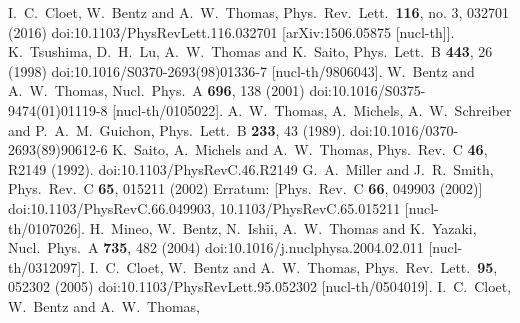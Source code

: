 \documentclass{ws-ijmpe}
\begin{document}
\begin{thebibliography}{0}
  I.~C.~Cloet, W.~Bentz and A.~W.~Thomas,
  Phys.\ Rev.\ Lett.\  {\bf 116}, no. 3, 032701 (2016)
  doi:10.1103/PhysRevLett.116.032701
  [arXiv:1506.05875 [nucl-th]].
%
  K.~Tsushima, D.~H.~Lu, A.~W.~Thomas and K.~Saito,
  Phys.\ Lett.\ B {\bf 443}, 26 (1998)
  doi:10.1016/S0370-2693(98)01336-7
  [nucl-th/9806043].
%
  W.~Bentz and A.~W.~Thomas,
  Nucl.\ Phys.\ A {\bf 696}, 138 (2001)
  doi:10.1016/S0375-9474(01)01119-8
  [nucl-th/0105022].
%
  A.~W.~Thomas, A.~Michels, A.~W.~Schreiber and P.~A.~M.~Guichon,
  Phys.\ Lett.\ B {\bf 233}, 43 (1989).
  doi:10.1016/0370-2693(89)90612-6
%
  K.~Saito, A.~Michels and A.~W.~Thomas,
  Phys.\ Rev.\ C {\bf 46}, R2149 (1992).
  doi:10.1103/PhysRevC.46.R2149
%
  G.~A.~Miller and J.~R.~Smith,
  Phys.\ Rev.\ C {\bf 65}, 015211 (2002)
  Erratum: [Phys.\ Rev.\ C {\bf 66}, 049903 (2002)]
  doi:10.1103/PhysRevC.66.049903, 10.1103/PhysRevC.65.015211
  [nucl-th/0107026].
%
  H.~Mineo, W.~Bentz, N.~Ishii, A.~W.~Thomas and K.~Yazaki,
  Nucl.\ Phys.\ A {\bf 735}, 482 (2004)
  doi:10.1016/j.nuclphysa.2004.02.011
  [nucl-th/0312097].
%
  I.~C.~Cloet, W.~Bentz and A.~W.~Thomas,
  Phys.\ Rev.\ Lett.\  {\bf 95}, 052302 (2005)
  doi:10.1103/PhysRevLett.95.052302
  [nucl-th/0504019].
%
  I.~C.~Cloet, W.~Bentz and A.~W.~Thomas,

\end{thebibliography}
\end{document}
